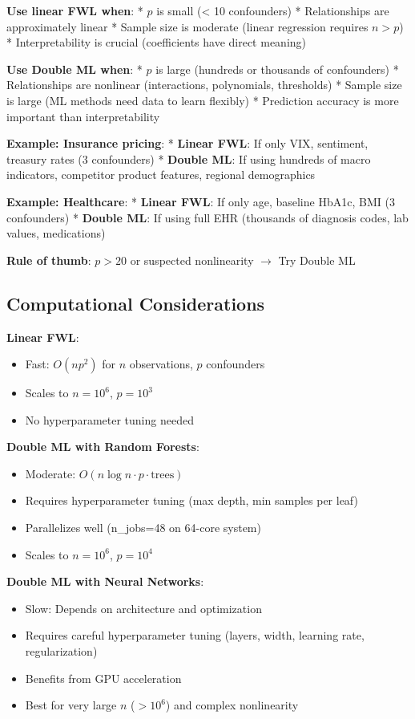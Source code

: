 \textbf{Use linear FWL when}: * \(p\) is small (\textless{} 10
confounders) * Relationships are approximately linear * Sample size is
moderate (linear regression requires \(n > p\)) * Interpretability is
crucial (coefficients have direct meaning)

\textbf{Use Double ML when}: * \(p\) is large (hundreds or thousands of
confounders) * Relationships are nonlinear (interactions, polynomials,
thresholds) * Sample size is large (ML methods need data to learn
flexibly) * Prediction accuracy is more important than interpretability

\textbf{Example: Insurance pricing}: * \textbf{Linear FWL}: If only VIX,
sentiment, treasury rates (3 confounders) * \textbf{Double ML}: If using
hundreds of macro indicators, competitor product features, regional
demographics

\textbf{Example: Healthcare}: * \textbf{Linear FWL}: If only age,
baseline HbA1c, BMI (3 confounders) * \textbf{Double ML}: If using full
EHR (thousands of diagnosis codes, lab values, medications)

\textbf{Rule of thumb}: \(p > 20\) or suspected nonlinearity $\to$ Try
Double ML

\subsection{Computational
Considerations}\label{_computational_considerations}

\textbf{Linear FWL}:
\begin{itemize}
\item Fast: $O(np^2)$ for $n$ observations, $p$ confounders
\item Scales to $n = 10^6$, $p = 10^3$
\item No hyperparameter tuning needed
\end{itemize}

\textbf{Double ML with Random Forests}:
\begin{itemize}
\item Moderate: $O(n \log n \cdot p \cdot \text{trees})$
\item Requires hyperparameter tuning (max depth, min samples per leaf)
\item Parallelizes well (n\_jobs=48 on 64-core system)
\item Scales to $n = 10^6$, $p = 10^4$
\end{itemize}

\textbf{Double ML with Neural Networks}:
\begin{itemize}
\item Slow: Depends on architecture and optimization
\item Requires careful hyperparameter tuning (layers, width, learning rate, regularization)
\item Benefits from GPU acceleration
\item Best for very large $n$ ($>10^6$) and complex nonlinearity
\end{itemize}

